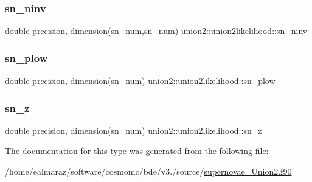\mbox{\label{structunion2_1_1union2likelihood_a3d959974befaf9c28e571a03c5de6f67}} 
\subsubsection{\texorpdfstring{sn\+\_\+ninv}{sn\_ninv}}
{\footnotesize\ttfamily double precision, dimension(\mbox{\hyperlink{namespaceunion2_a263e630a36e6cdb0d23c6982c2d13b8e}{sn\+\_\+num}},\mbox{\hyperlink{namespaceunion2_a263e630a36e6cdb0d23c6982c2d13b8e}{sn\+\_\+num}}) union2\+::union2likelihood\+::sn\+\_\+ninv\hspace{0.3cm}{\ttfamily [private]}}

\mbox{\label{structunion2_1_1union2likelihood_a41fe0f203cdad7881d426ad17258b0bd}} 
\subsubsection{\texorpdfstring{sn\+\_\+plow}{sn\_plow}}
{\footnotesize\ttfamily double precision, dimension(\mbox{\hyperlink{namespaceunion2_a263e630a36e6cdb0d23c6982c2d13b8e}{sn\+\_\+num}}) union2\+::union2likelihood\+::sn\+\_\+plow\hspace{0.3cm}{\ttfamily [private]}}

\mbox{\label{structunion2_1_1union2likelihood_a440d318d9c92aa180bcba6718dc1334a}} 
\subsubsection{\texorpdfstring{sn\+\_\+z}{sn\_z}}
{\footnotesize\ttfamily double precision, dimension(\mbox{\hyperlink{namespaceunion2_a263e630a36e6cdb0d23c6982c2d13b8e}{sn\+\_\+num}}) union2\+::union2likelihood\+::sn\+\_\+z\hspace{0.3cm}{\ttfamily [private]}}



The documentation for this type was generated from the following file\+:\begin{DoxyCompactItemize}
\item 
/home/ealmaraz/software/cosmomc/bde/v3./source/\mbox{\hyperlink{supernovae__Union2_8f90}{supernovae\+\_\+\+Union2.\+f90}}\end{DoxyCompactItemize}

